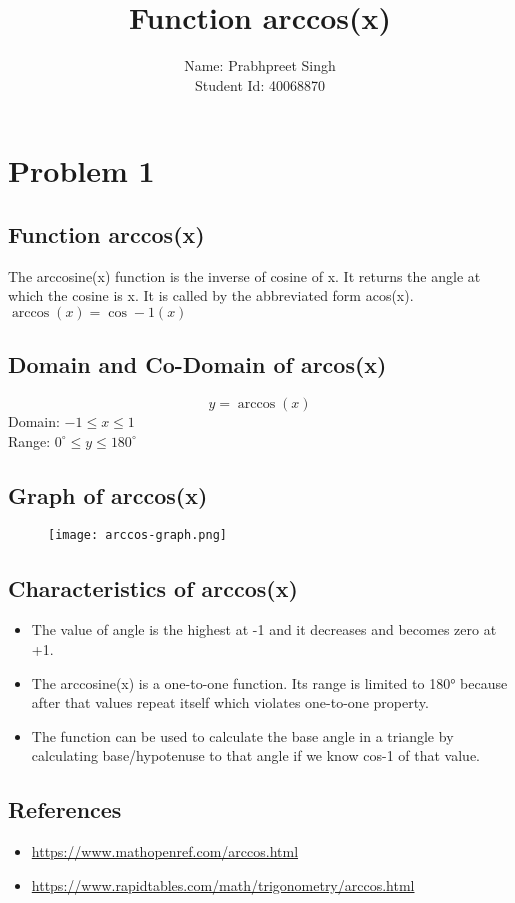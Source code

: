 \documentclass[12pt]{report}
\begin{document}
	\title{Function arccos(x)} %
	\author{Name: Prabhpreet Singh \\Student Id: 40068870} %
	
	\maketitle
	\section*{Problem 1} %
	\subsection*{Function arccos(x)} %
	The arccosine(x) function is the inverse of cosine of x. It returns the angle at which the cosine is x. It is called by the abbreviated form acos(x). $\arccos(x) = \cos-1(x)$
	\subsection*{Domain and Co-Domain of arcos(x)}
	\begin{equation} %
	y = \arccos(x)
	\end{equation}
	Domain: $-1\leq x \leq1$\\Range: $0^\circ \leq y \leq 180^\circ$
	\subsection*{Graph of arccos(x)}
	\begin{figure}[H]%
		\centering %
		\texttt{[image: arccos-graph.png]}
		\label{Graph of arccos(x)} %
	\end{figure}
	\subsection*{Characteristics of arccos(x)}
	\begin{itemize} %
		\item The value of angle is the highest at -1 and it decreases and becomes zero at +1.
		\item The arccosine(x) is a one-to-one function. Its range is limited to 180° because after that values repeat itself which violates one-to-one property.
		\item The function can be used to calculate the base angle in a triangle by calculating base/hypotenuse to that angle if we know cos-1 of that value.
	\end{itemize}
	\subsection*{References}
	\begin{itemize} 
		\item \url{https://www.mathopenref.com/arccos.html}
		\item \url{https://www.rapidtables.com/math/trigonometry/arccos.html}
	\end{itemize}
\end{document}
